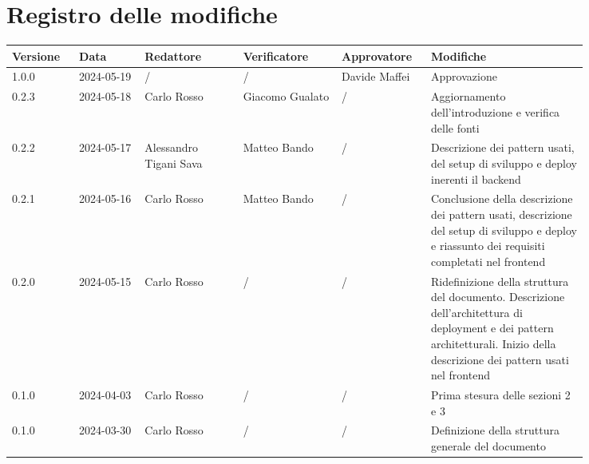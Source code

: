 \section*{Registro delle modifiche}
 {
  \renewcommand{\arraystretch}{1.5}
  \scriptsize
  \begin{longtable}{p{0.10\linewidth}p{0.10\linewidth}p{0.15\linewidth}p{0.15\linewidth}p{0.10\linewidth}p{0.24\linewidth}}
	  \textbf{Versione} & \textbf{Data} & \textbf{Redattore} 		& \textbf{Verificatore} & \textbf{Approvatore} 	& \textbf{Modifiche}                                 \\
	  \toprule
	  1.0.0             & 2024-05-19    & /  & / & Davide Maffei & Approvazione \\
	  \hline 
	  0.2.3             & 2024-05-18    & Carlo Rosso	& Giacomo Gualato & / & Aggiornamento dell'introduzione e verifica delle fonti \\
	  \hline 
	  0.2.2             & 2024-05-17    & Alessandro Tigani Sava	& Matteo Bando 			& /						& Descrizione dei pattern usati,
	  del setup di sviluppo e deploy inerenti il backend \\
	  \hline 
	  0.2.1             & 2024-05-16    & Carlo Rosso				& Matteo Bando 			& /						& Conclusione della descrizione dei pattern usati,
	  descrizione del setup di sviluppo e deploy e riassunto dei requisiti completati nel frontend \\
	  \hline
	  0.2.0             & 2024-05-15    & Carlo Rosso                                      & /
	                    & /             & Ridefinizione della struttura del documento.
	  Descrizione dell'architettura di deployment e dei pattern architetturali.
	  Inizio della descrizione dei pattern usati nel frontend                                                                                                                                  \\
	  \hline
	  0.1.0             & 2024-04-03    & Carlo Rosso                                      & /                     & /                    & Prima stesura delle sezioni 2 e 3                  \\
	  \hline
	  0.1.0             & 2024-03-30    & Carlo Rosso                                      & /                     & /                    & Definizione della struttura generale del documento \\
	  \bottomrule
  \end{longtable}
 }
